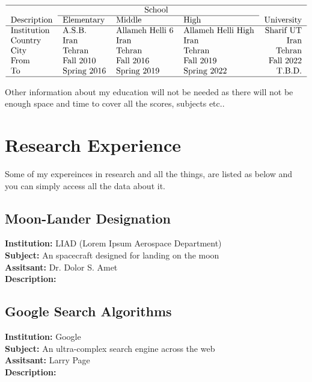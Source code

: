 \documentclass[12pt,a4paper]{report}
\begin{document}
\[
\begin{tabular}{llllr}
\hline
\multicolumn{5}{c}{School} \\
\cline{2-4}
Description	& Elementary	& Middle 			& High 			& University	\\
\hline
Institution 	& A.S.B.		& Allameh Helli 6	& Allameh Helli High	& Sharif UT	\\
Country     & Iran		& Iran 			& Iran			& Iran 		\\
City       	& Tehran    	& Tehran			& Tehran			& Tehran 		\\
From  	& Fall 2010      	& Fall 2016    		& Fall 2019		& Fall 2022  	\\
To 		& Spring 2016	& Spring 2019		& Spring 2022		& T.B.D.		\\
\hline
\end{tabular}
\]

Other information about my education will not be needed as there will not be enough space and time to cover all the scores, subjects etc.. \\ 
\lipsum[3]

\chapter{Research Experience}

Some of my expereinces in research and all the things, are listed as below and you can simply access all the data about it.

\section{Moon-Lander Designation}
{\textbf {Institution:}} LIAD (Lorem Ipsum Aerospace Department) \\
{\textbf {Subject:}} An spacecraft designed for landing on the moon \\
{\textbf {Assitsant:}} Dr. Dolor S. Amet \\
{\textbf {Description:}} 
\\ \lipsum[1]

\section{Google Search Algorithms}
{\textbf {Institution:}} Google \\
{\textbf {Subject:}} An ultra-complex search engine across the web\\
{\textbf {Assitsant:}} Larry Page \\
{\textbf {Description:}} 
\\ \lipsum[2]
\end{document}
